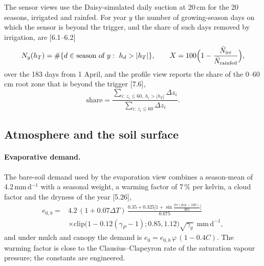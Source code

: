 \documentclass[preprint,12pt]{elsarticle}
\begin{document}
The sensor views use the Daisy-simulated daily suction at 20\,cm for the 20 seasons, irrigated and rainfed. For year $y$ the number of growing-season days on which the sensor is beyond the trigger, and the share of such days removed by irrigation, are [6.1--6.2]
\begin{equation}
N_y(h_T)=\#\{d\in\text{season of }y:\ h_d>|h_T|\},\qquad X=100\Bigl(1-\frac{\bar N_{\mathrm{irr}}}{\bar N_{\mathrm{rainfed}}}\Bigr),
\label{eq:Ny}
\end{equation}
over the 183 days from 1 April, and the profile view reports the share of the 0--60\,cm root zone that is beyond the trigger [7.6],
\begin{equation}
\mathrm{share}=\frac{\sum_{i:\,z_i\le60,\ h_i>|h_T|}\Delta z_i}{\sum_{i:\,z_i\le60}\Delta z_i}.
\label{eq:share}
\end{equation}

\subsection{Atmosphere and the soil surface}
\label{sec:sys-atmos}
\paragraph{Evaporative demand.} The bare-soil demand used by the evaporation view combines a season-mean of 4.2\,mm\,d$^{-1}$ with a seasonal weight, a warming factor of 7\,\% per kelvin, a cloud factor and the dryness of the year [5.26],
\begin{equation}
\begin{aligned}e_{0,b}={}&4.2\,(1+0.07\Delta T)\,\frac{0.35+0.325\bigl[1+\sin\frac{2\pi(\mathrm{doy}-100)}{365}\bigr]}{0.675}\\&\times\mathrm{clip}\bigl(1-0.12(\gamma_P-1);0.85,1.12\bigr)\sqrt{\gamma_y}\ \ \mathrm{mm\,d^{-1}},\end{aligned}
\label{eq:e0}
\end{equation}
and under mulch and canopy the demand is $e_0=e_{0,b}\,\varphi\,(1-0.4C)$. The warming factor is close to the Clausius--Clapeyron rate of the saturation vapour pressure; the constants are engineered.
\end{document}
